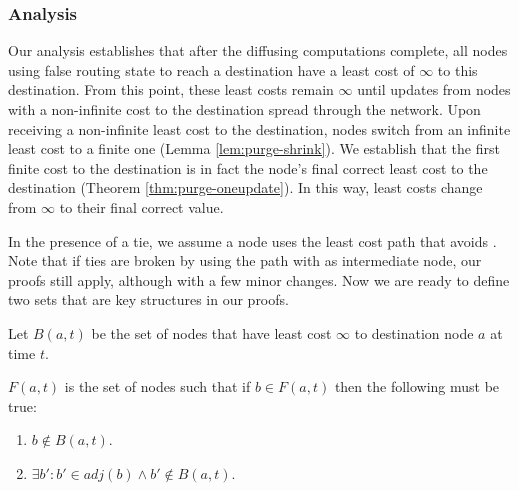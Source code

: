 {{\subsubsection{\purge Analysis}
\label{subsubsec:purge-analysis}

Our \purge analysis establishes that after the diffusing computations complete, all nodes using false routing state to reach a destination
have a least cost of $\infty$ to this destination.  %
From this point, these least costs remain $\infty$ until updates from nodes with a non-infinite cost to the destination spread through the network.  Upon receiving a non-infinite
least cost to the destination, nodes switch from an infinite least cost to a finite one (Lemma \ref{lem:purge-shrink}).  We establish that the first finite cost to the destination is in fact the node's final correct
least cost to the destination (Theorem \ref{thm:purge-oneupdate}). In this way, least costs change from $\infty$ to their final correct value.

In the presence of a tie, we assume a node uses the least cost path that avoids \bads. Note that if ties are broken by using the path with \bad as intermediate node, our
proofs still apply, although with a few minor changes. 
Now we are ready to define two sets that are key structures in our \purge proofs.

\begin{define}
Let $B(a,t)$ be the set of nodes that have least cost $\infty$ to destination node $a$ at time $t$. %
\end{define}

\begin{define}
$F(a,t)$ is the set of nodes such that if $b \in F(a,t)$ then the following must be true:
\begin{enumerate}
	\item $b \notin B(a,t)$.

	\item $\exists b': b' \in adj(b) \wedge b' \notin B(a,t)$.
	

\end{enumerate}
\end{define}}}
